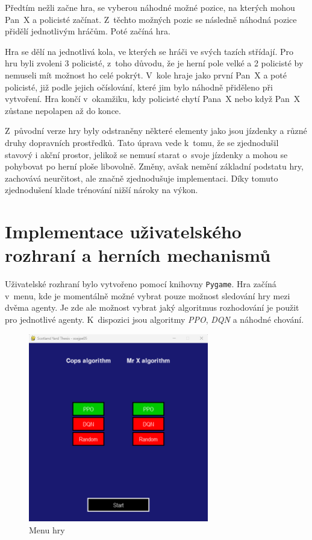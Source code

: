 Předtím nežli začne hra, se vyberou náhodné možné pozice, na kterých mohou Pan~X a policisté začínat.
Z~těchto možných pozic se následně náhodná pozice přidělí jednotlivým hráčům.
Poté začíná hra.

Hra se dělí na jednotlivá kola, ve kterých se hráči ve svých tazích střídají.
Pro hru byli zvoleni 3 policisté, z~toho důvodu, že je herní pole velké a 2 policisté by nemuseli mít možnost ho celé pokrýt.
V~kole hraje jako první Pan~X a poté policisté, již podle jejich očíslování, které jim bylo náhodně přiděleno při vytvoření.
Hra končí v~okamžiku, kdy policisté chytí Pana~X nebo když Pan~X zůstane nepolapen až do konce.

Z~původní verze hry byly odstraněny některé elementy jako jsou jízdenky a různé druhy dopravních prostředků.
Tato úprava vede k~tomu, že se zjednodušil stavový i akční prostor, jelikož se nemusí starat o~svoje jízdenky a mohou se pohybovat po herní ploše libovolně.
Změny, avšak nemění základní podstatu hry, zachovává neurčitost, ale značně zjednodušuje implementaci.
Díky tomuto zjednodušení klade trénování nižší nároky na výkon.

\section{Implementace uživatelského rozhraní a herních mechanismů}\label{subsec:implementace-uzivatelskeho-rozrani-a-hernich-mechanismu}

Uživatelské rozhraní bylo vytvořeno pomocí knihovny \texttt{Pygame}.
Hra začíná v~menu, kde je momentálně možné vybrat pouze možnost sledování hry mezi dvěma agenty.
Je zde ale možnost vybrat jaký algoritmus rozhodování je použit pro jednotlivé agenty.
K~dispozici jsou algoritmy \emph{PPO}, \emph{DQN} a náhodné chování.

\begin{figure}[H]
	\centering
	\includegraphics[width=0.7\textwidth]{obrazky-figures/game_title}
	\caption{Menu hry}\label{fig:game_title}
\end{figure}

